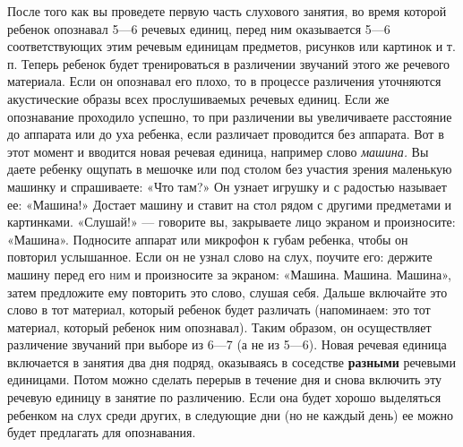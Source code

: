 \documentclass[a5paper]{book}
\renewcommand{\emph}[1]{\textit{#1}}
\begin{document}
После того как вы проведете первую часть слухового занятия, во время
которой ребенок опознавал 5---6 речевых единиц, перед ним оказывается
5---6 соответствующих этим речевым единицам предметов, рисунков или
картинок и т. п. Теперь ребенок будет тренироваться в различении
звучаний этого же речевого материала. Если он опознавал его плохо, то в
процессе различения уточняются акустические образы всех прослушиваемых
речевых единиц. Если же опознавание проходило успешно, то при различении
вы увеличиваете расстояние до аппарата или до уха ребенка, если
различает проводится без аппарата. Вот в этот момент и вводится новая
речевая единица, например слово \emph{машина.} Вы даете ребенку ощупать
в мешочке или под столом без участия зрения маленькую машинку и
спрашиваете: «Что там?» Он узнает игрушку и с радостью называет ее:
«Машина!» Достает машину и ставит на стол рядом с другими предметами и
картинками. «Слушай!» --- говорите вы, закрываете лицо экраном и
произносите: «Машина». Подносите аппарат или микрофон к губам ребенка,
чтобы он повторил услышанное. Если он не узнал слово на слух, поучите
его: держите машину перед его \textsc{ним} и произносите за экраном:
«Машина. Машина. Машина», затем предложите ему повторить это слово,
слушая себя. Дальше включайте это слово в тот материал, который ребенок
будет различать (напоминаем: это тот материал, который ребенок ним
опознавал). Таким образом, он осуществляет различение звучаний при
выборе из 6---7 (а не из 5---6). Новая речевая единица включается в
занятия два дня подряд, оказываясь в соседстве \textbf{разными} речевыми
единицами. Потом можно сделать перерыв в течение дня и снова включить
эту речевую единицу в занятие по различению. Если она будет хорошо
выделяться ребенком на слух среди других, в следующие дни (но не каждый
день) ее можно будет предлагать для опознавания.
\end{document}
